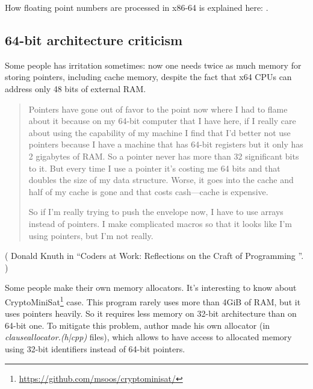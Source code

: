 How floating point numbers are processed in x86-64 is explained here: .

\subsection{64-bit architecture criticism}

Some people has irritation sometimes: now one needs twice as much memory for storing pointers,
including cache memory, despite the fact that x64 \ac{CPU}s can address only 48 bits of external 
\ac{RAM}.

\begin{framed}
\begin{quotation}
Pointers have gone out of favor to the point now where I had to
flame about it because on my 64-bit computer that I have here, if I really
care about using the capability of my machine I find that I’d better not use
pointers because I have a machine that has 64-bit registers but it only has 2
gigabytes of RAM. So a pointer never has more than 32 significant bits to it.
But every time I use a pointer it’s costing me 64 bits and that doubles the
size of my data structure. Worse, it goes into the cache and half of my
cache is gone and that costs cash—cache is expensive.

So if I’m really trying to push the envelope now, I have to use arrays instead
of pointers. I make complicated macros so that it looks like I’m using
pointers, but I’m not really.
\end{quotation}
\end{framed}

( Donald Knuth in ``Coders at Work: Reflections on the Craft of Programming ''. )

Some people make their own memory allocators.
It's interesting to know about CryptoMiniSat\footnote{\url{https://github.com/msoos/cryptominisat/}} case.
This program rarely uses more than 4GiB of \ac{RAM}, but it uses pointers heavily.
So it requires less memory on 32-bit architecture than on 64-bit one.
To mitigate this problem, author made his own allocator (in \emph{clauseallocator.(h|cpp)} files),
which allows to have access to allocated memory using 32-bit identifiers instead of 64-bit pointers.

